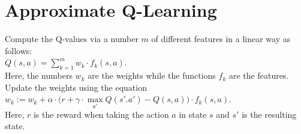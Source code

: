 \section{Approximate Q-Learning}
Compute the Q-values via a number $m$ of different features in a linear way as follows:
\\[0.2cm]
\hspace*{1.3cm}
$Q(s,a) = \sum\limits_{k=1}^m w_k \cdot f_k(s,a)$.
\\[0.2cm]
Here, the numbers $w_k$ are the weights while the functions $f_k$ are the features.  Update the
weights using the equation
\\[0.2cm]
\hspace*{1.3cm}
$w_k := w_k + \alpha \cdot  \bigl(r + \gamma \cdot \max\limits_{a'} Q(s'.a') - Q(s,a)\bigr) \cdot f_k(s, a)$.
\\[0.2cm]
Here, $r$ is the reward when taking the action $a$ in state $s$ and $s'$ is the resulting state.

